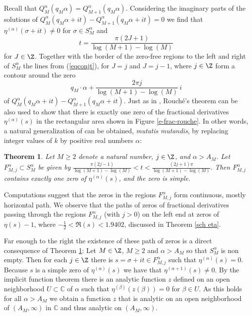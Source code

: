 \documentclass{amsart}
\theoremstyle{plain}
\newtheorem{theorem}{Theorem}[section]
\theoremstyle{definition}
\newcommand{\etalpha}{\eta^{(\alpha)}}
\newcommand{\C}{\mathbb{C}} \newcommand{\N}{\mathbb{N}}
\begin{document}
Recall that $Q_M^{\alpha}(q_M \alpha)=Q_{M+1}^{\alpha}(q_M \alpha)$.
Considering the imaginary parts of the solutions of $Q_M^{\alpha}(q_M \alpha+it)-Q_{M+1}^{\alpha}(q_M \alpha+it)=0$ we find
that $\etalpha(\sigma+it)\ne 0$ for $\sigma\in S_M^\alpha$ and
\begin{equation}\label{eqconjt}
t = \frac{\pi (2J+1)}{\log(M+1)-\log(M)}
\end{equation} 
for $J\in\Z$.
Together with the border of the zero-free regions to the left and right of $S_M^\alpha$ the lines from (\ref{eqconjt}), 
for $J=j$ and $J=j-1$, where $j\in\Z$ form a contour around the zero 
\begin{equation*}%
q_M\cdot\alpha+\frac{2\pi j}{\log(M+1)-\log(M)}\,i
\end{equation*}
of $Q_M^{\alpha}(q_M \alpha+it)-Q_{M+1}^{\alpha}(q_M \alpha+it)$.
Just as in \cite{bps}, Rouch\'e's theorem can be also used to show that there is exactly one
zero of the fractional derivatives $\etalpha(s)$ in the rectangular area shown in Figure \ref{e-frac-rouche}. In other words, a natural generalization of \cite[Theorem 2.2]{bps} can be obtained, {\em mutatis mutandis}, 
by replacing integer values of $k$ by positive real numbers $\alpha$: 


\begin{theorem}\label{thmboxzeroeta} 
Let $M\ge2$ denote a natural number, $j\in\Z$, and $\alpha>A_M$.
Let $F^\alpha_{M,j}\subset S_M^\alpha$ be given by 
\(%
\frac{\pi (2j-1)}{\log(M+1)-\log(M)}<t<\frac{(2j+1)\pi }{\log(M+1)-\log(M)}.
\)
Then $F^\alpha_{M,j}$ contains exactly one zero of $\etalpha(s)$, and the zero is simple.
\end{theorem}

Computations suggest that the zeros in the regions $F_{M,j}^\alpha$ 
form continuous, mostly horizontal path.
We observe that the paths of zeros of fractional derivatives passing through the regions 
$F_{M,j}^\alpha$ (with $j>0$) on the left end at zeros of $\eta(s)-1$, where $-\frac{1}{2}<\Re(s)<1.9402$, discussed in Theorem \ref{sch eta}.

Far enough to the right the existence of these path of zeros is a direct consequence of Theorem \ref{thmboxzeroeta}:
Let $M\in\Z$, $M\ge 2$ and $\alpha>A_M$ so that $S_M^\alpha$ is non empty.
Then for each $j\in\Z$ there is $s=\sigma+it\in F^\alpha_{M,j}$ such that $\etalpha(s)=0$.
Because $s$ is a simple zero of $\etalpha(s)$ we have that $\eta^{(\alpha+1)}(s)\ne 0$.
By the implicit function theorem there is an analytic function $z$ defined 
on an open neighborhood $U\subset\C$ of $\alpha$ such that $\eta^{(\beta)}(z(\beta))=0$ for $\beta\in U$.
As this holds for all $\alpha>A_M$ we obtain a
function $z$ that is analytic on an open neighborhood of 
$(A_M,\infty)$ in $\C$
and thus analytic on $(A_M,\infty)$.
\end{document}
